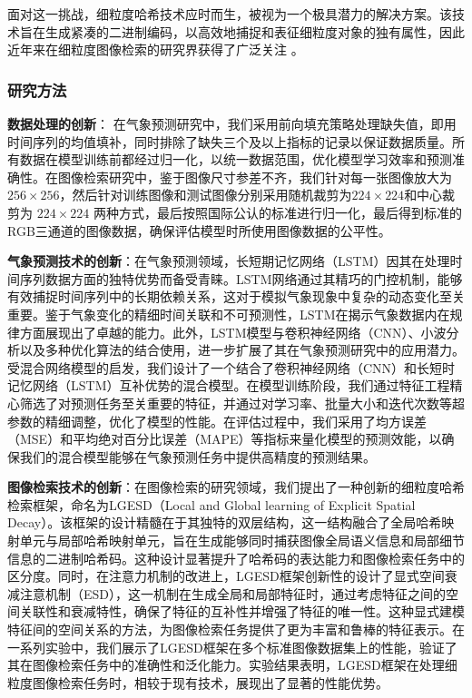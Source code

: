 面对这一挑战，细粒度哈希技术应时而生，被视为一个极具潜力的解决方案。该技术旨在生成紧凑的二进制编码，以高效地捕捉和表征细粒度对象的独有属性，因此近年来在细粒度图像检索的研究界获得了广泛关注 \cite{solving9157668}\cite{Zeng_2024}\cite{DSH9037360}。

\subsubsection{研究方法}

\textbf{数据处理的创新}：
在气象预测研究中，我们采用前向填充策略处理缺失值，即用时间序列的均值填补，同时排除了缺失三个及以上指标的记录以保证数据质量。所有数据在模型训练前都经过归一化，以统一数据范围，优化模型学习效率和预测准确性。在图像检索研究中，鉴于图像尺寸参差不齐，我们针对每一张图像放大为 $256 \times 256$，然后针对训练图像和测试图像分别采用随机裁剪为$224 \times 224$和中心裁剪为 $224 \times 224$ 两种方式，最后按照国际公认的标准进行归一化，最后得到标准的RGB三通道的图像数据，确保评估模型时所使用图像数据的公平性。

\textbf{气象预测技术的创新}：在气象预测领域，长短期记忆网络（LSTM）因其在处理时间序列数据方面的独特优势而备受青睐。LSTM网络通过其精巧的门控机制，能够有效捕捉时间序列中的长期依赖关系，这对于模拟气象现象中复杂的动态变化至关重要。鉴于气象变化的精细时间关联和不可预测性，LSTM在揭示气象数据内在规律方面展现出了卓越的能力。此外，LSTM模型与卷积神经网络（CNN）、小波分析以及多种优化算法的结合使用\cite{HJKZ2024011600J}\cite{JYGC20240415002}\cite{HBYD202401011}\cite{DLJS202401002}，进一步扩展了其在气象预测研究中的应用潜力。受混合网络模型的启发，我们设计了一个结合了卷积神经网络（CNN）和长短时记忆网络（LSTM）互补优势的混合模型。在模型训练阶段，我们通过特征工程精心筛选了对预测任务至关重要的特征，并通过对学习率、批量大小和迭代次数等超参数的精细调整，优化了模型的性能。在评估过程中，我们采用了均方误差（MSE）和平均绝对百分比误差（MAPE）等指标来量化模型的预测效能，以确保我们的混合模型能够在气象预测任务中提供高精度的预测结果。

\textbf{图像检索技术的创新}：在图像检索的研究领域，我们提出了一种创新的细粒度哈希检索框架，命名为LGESD（Local and Global learning of Explicit Spatial Decay）。该框架的设计精髓在于其独特的双层结构，这一结构融合了全局哈希映射单元与局部哈希映射单元，旨在生成能够同时捕获图像全局语义信息和局部细节信息的二进制哈希码。这种设计显著提升了哈希码的表达能力和图像检索任务中的区分度。同时，在注意力机制的改进上，LGESD框架创新性的设计了显式空间衰减注意机制（ESD），这一机制在生成全局和局部特征时，通过考虑特征之间的空间关联性和衰减特性，确保了特征的互补性并增强了特征的唯一性。这种显式建模特征间的空间关系的方法，为图像检索任务提供了更为丰富和鲁棒的特征表示。在一系列实验中，我们展示了LGESD框架在多个标准图像数据集上的性能，验证了其在图像检索任务中的准确性和泛化能力。实验结果表明，LGESD框架在处理细粒度图像检索任务时，相较于现有技术，展现出了显著的性能优势。

